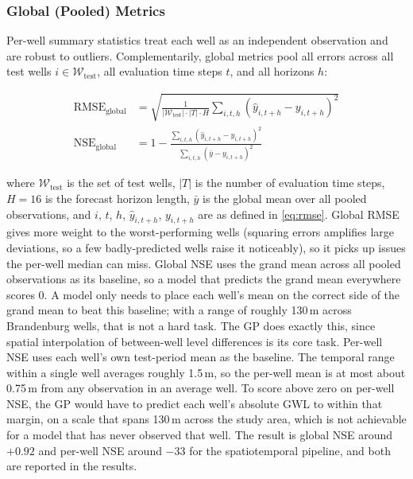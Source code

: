 \subsubsection{Global (Pooled) Metrics}
\label{subsec:global_metrics}

Per-well summary statistics treat each well as an independent observation and are robust to
outliers. Complementarily, global metrics pool all errors across all test wells
$i \in \mathcal{W}_\text{test}$, all evaluation time steps $t$, and all horizons $h$:

\begin{align}
  \text{RMSE}_\text{global} &= \sqrt{\frac{1}{|\mathcal{W}_\text{test}| \cdot |T| \cdot H}
    \sum_{i,t,h} \left(\hat{y}_{i,t+h} - y_{i,t+h}\right)^2}
  \label{eq:global_rmse}\\
  \text{NSE}_\text{global} &= 1 - \frac{\sum_{i,t,h} (\hat{y}_{i,t+h} - y_{i,t+h})^2}
    {\sum_{i,t,h} (\bar{y} - y_{i,t+h})^2}
  \label{eq:global_nse}
\end{align}

where $\mathcal{W}_\text{test}$ is the set of test wells, $|T|$ is the number of evaluation
time steps, $H = 16$ is the forecast horizon length, $\bar{y}$ is the global mean over all
pooled observations, and $i$, $t$, $h$, $\hat{y}_{i,t+h}$, $y_{i,t+h}$ are as defined in
\cref{eq:rmse}. Global RMSE gives more weight to the worst-performing wells (squaring errors amplifies large deviations, so a few badly-predicted wells raise it noticeably), so it picks up issues the per-well median can miss. Global NSE uses the grand mean across all pooled observations as its baseline, so a model that predicts the grand mean everywhere scores 0. A model only needs to place each well's mean on the correct side of the grand mean to beat this baseline; with a range of roughly 130\,m across Brandenburg wells, that is not a hard task. The GP does exactly this, since spatial interpolation of between-well level differences is its core task. Per-well NSE uses each well's own test-period mean as the baseline. The temporal range within a single well averages roughly 1.5\,m, so the per-well mean is at most about 0.75\,m from any observation in an average well. To score above zero on per-well NSE, the GP would have to predict each well's absolute GWL to within that margin, on a scale that spans 130\,m across the study area, which is not achievable for a model that has never observed that well. The result is global NSE around $+0.92$ and per-well NSE around $-33$ for the spatiotemporal pipeline, and both are reported in the results.

